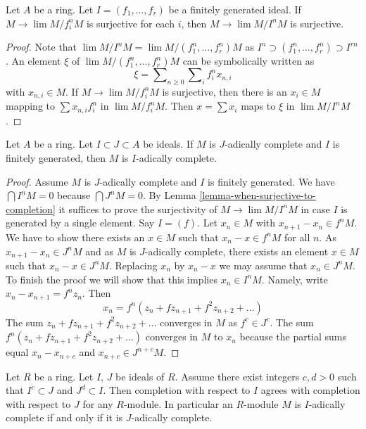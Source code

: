\begin{lemma}
\label{lemma-when-surjective-to-completion}
Let $A$ be a ring. Let $I = (f_1, \ldots, f_r)$ be a finitely
generated ideal. If $M \to \lim M/f_i^nM$ is surjective for
each $i$, then $M \to \lim M/I^nM$ is surjective.
\end{lemma}

\begin{proof}
Note that $\lim M/I^nM = \lim M/(f_1^n, \ldots, f_r^n)M$ as
$I^n \supset (f_1^n, \ldots, f_r^n) \supset I^{rn}$.
An element $\xi$ of $\lim M/(f_1^n, \ldots, f_r^n)M$ can be symbolically
written as
$$
\xi = \sum\nolimits_{n \geq 0} \sum\nolimits_i f_i^n x_{n, i}
$$
with $x_{n, i} \in M$. If $M \to \lim M/f_i^nM$ is surjective, then there is
an $x_i \in M$ mapping to $\sum x_{n, i} f_i^n$ in $\lim M/f_i^nM$.
Then $x = \sum x_i$ maps to $\xi$ in $\lim M/I^nM$.
\end{proof}

\begin{lemma}
\label{lemma-complete-by-sub}
Let $A$ be a ring. Let $I \subset J \subset A$ be ideals.
If $M$ is $J$-adically complete and $I$ is finitely generated, then
$M$ is $I$-adically complete.
\end{lemma}

\begin{proof}
Assume $M$ is $J$-adically complete and $I$ is finitely generated.
We have $\bigcap I^nM = 0$ because $\bigcap J^nM = 0$. By
Lemma \ref{lemma-when-surjective-to-completion}
it suffices to prove the surjectivity of $M \to \lim M/I^nM$ in case
$I$ is generated by a single element. Say $I = (f)$.
Let $x_n \in M$ with $x_{n + 1} - x_n \in f^nM$. We have to show there exists
an $x \in M$ such that $x_n - x \in f^nM$ for all $n$.
As $x_{n + 1} - x_n \in J^nM$ and as $M$ is $J$-adically complete,
there exists an element $x \in M$ such that $x_n - x \in J^nM$.
Replacing $x_n$ by $x_n - x$ we may assume that $x_n \in J^nM$.
To finish the proof we will show that this implies $x_n \in I^nM$.
Namely, write $x_n - x_{n + 1} = f^nz_n$.
Then
$$
x_n = f^n(z_n + fz_{n + 1} + f^2z_{n + 2} + \ldots)
$$
The sum $z_n + fz_{n + 1} + f^2z_{n + 2} + \ldots$ converges in $M$
as $f^c \in J^c$. The sum $f^n(z_n + fz_{n + 1} + f^2z_{n + 2} + \ldots)$
converges in $M$ to $x_n$ because
the partial sums equal $x_n - x_{n + c}$ and $x_{n + c} \in J^{n + c}M$.
\end{proof}

\begin{lemma}
\label{lemma-change-ideal-completion}
Let $R$ be a ring.
Let $I$, $J$ be ideals of $R$.
Assume there exist integers $c, d > 0$ such that
$I^c \subset J$ and $J^d \subset I$.
Then completion with respect to $I$ agrees with completion
with respect to $J$ for any $R$-module.
In particular an $R$-module $M$ is $I$-adically complete
if and only if it is $J$-adically complete.
\end{lemma}

